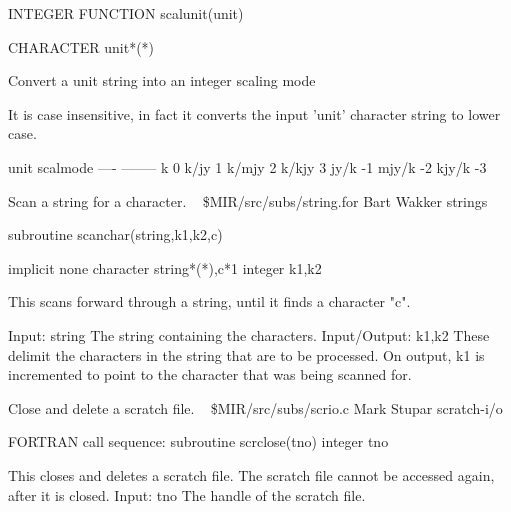 \par{\tenpoint
{\eightpoint\begintt
        INTEGER FUNCTION scalunit(unit)

        CHARACTER unit*(*)

   Convert a unit string into an integer scaling mode 

   It is case insensitive, in fact it converts the input
   'unit' character string to lower case.

       unit        scalmode
       ----        --------
       k           0
       k/jy        1
       k/mjy       2
       k/kjy       3
       jy/k       -1
       mjy/k      -2
       kjy/k      -3
\endtt}
\par}
%
\noindent Scan a string for a character.
\newline \ 
\newline {} \$MIR/src/subs/string.for
\newline {} Bart Wakker
\newline {} strings
\par{\tenpoint
{\eightpoint\begintt
        subroutine scanchar(string,k1,k2,c)

        implicit none
        character string*(*),c*1
        integer k1,k2

  This scans forward through a string, until it finds a character "c".

  Input:
    string     The string containing the characters.
  Input/Output:
    k1,k2      These delimit the characters in the string that are
               to be processed. On output, k1 is incremented to point
               to the character that was being scanned for.
\endtt}
\par}
%
\noindent Close and delete a scratch file.
\newline \ 
\newline {} \$MIR/src/subs/scrio.c
\newline {} Mark Stupar
\newline \abox{Keywords:} scratch-i/o
\par{\tenpoint
{\eightpoint\begintt
FORTRAN call sequence:
        subroutine scrclose(tno)
        integer tno

  This closes and deletes a scratch file. The scratch file cannot be
  accessed again, after it is closed.
  Input:
    tno         The handle of the scratch file.                         
\endtt}
\par}
%
